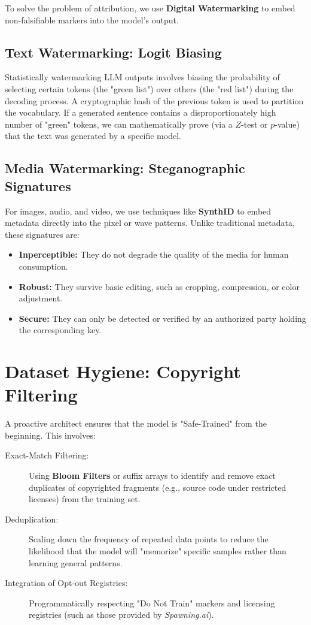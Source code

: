 To solve the problem of attribution, we use \textbf{Digital Watermarking} to embed non-falsifiable markers into the model's output.

\subsection{Text Watermarking: Logit Biasing}
Statistically watermarking LLM outputs involves biasing the probability of selecting certain tokens (the "green list") over others (the "red list") during the decoding process. 
A cryptographic hash of the previous token is used to partition the vocabulary. If a generated sentence contains a disproportionately high number of "green" tokens, we can mathematically prove (via a $Z$-test or $p$-value) that the text was generated by a specific model.

\subsection{Media Watermarking: Steganographic Signatures}
For images, audio, and video, we use techniques like \textbf{SynthID} to embed metadata directly into the pixel or wave patterns. Unlike traditional metadata, these signatures are:
\begin{itemize}
    \item \textbf{Inperceptible:} They do not degrade the quality of the media for human consumption.
    \item \textbf{Robust:} They survive basic editing, such as cropping, compression, or color adjustment.
    \item \textbf{Secure:} They can only be detected or verified by an authorized party holding the corresponding key.
\end{itemize}

\section{Dataset Hygiene: Copyright Filtering}
\label{sec:dataset_hygiene}

A proactive architect ensures that the model is "Safe-Trained" from the beginning. This involves:

\begin{description}
  \item[Exact-Match Filtering:] Using \textbf{Bloom Filters} or suffix arrays to identify and remove exact duplicates of copyrighted fragments (e.g., source code under restricted licenses) from the training set.
  \item[Deduplication:] Scaling down the frequency of repeated data points to reduce the likelihood that the model will "memorize" specific samples rather than learning general patterns.
  \item[Integration of Opt-out Registries:] Programmatically respecting "Do Not Train" markers and licensing registries (such as those provided by \textit{Spawning.ai}).
\end{description}

